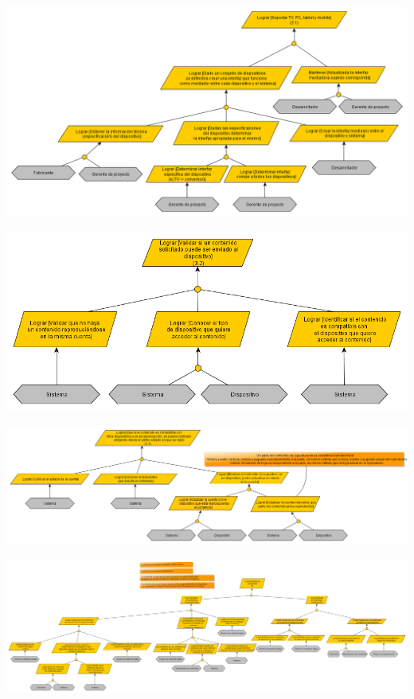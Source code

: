 \documentclass[11pt, a4paper, spanish]{article}
\begin{document}
\newpage
	\begin{center}
		\includegraphics[scale=0.35]{Diagramas/3-1ModelodeObjetivosTransparencia.png}
	\end{center}
\newpage
	\begin{center}
		\includegraphics[scale=0.35]{Diagramas/3-2ModelodeObjetivosTransparencia.png}
	\end{center}
\newpage
	\begin{center}
		\includegraphics[scale=0.35]{Diagramas/3-3ModelodeObjetivosTransparencia.png}
	\end{center}
\newpage
	\begin{center}
		\includegraphics[scale=0.35]{Diagramas/4ModelodeObjetivosCalidaddecontenidos.png}
	\end{center}
\newpage
\end{document}
